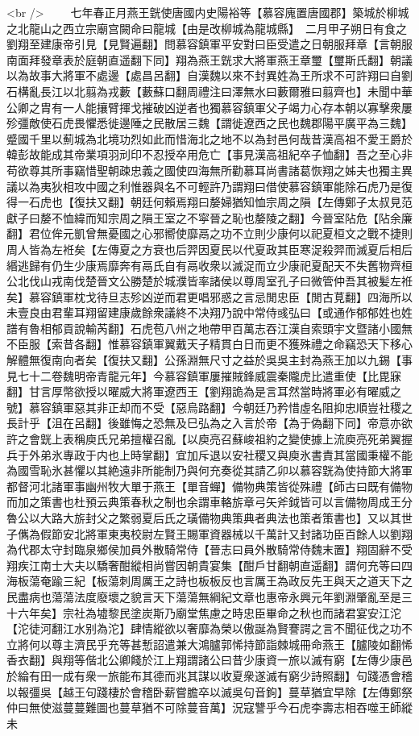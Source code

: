 <br />
　　七年春正月燕王皝使唐國内史陽裕等【慕容廆置唐國郡】築城於柳城之北龍山之西立宗廟宫闕命曰龍城【由是改柳城為龍城縣】　二月甲子朔日有食之　劉翔至建康帝引見【見賢遍翻】問慕容鎮軍平安對曰臣受遣之日朝服拜章【言朝服南面拜發章表於庭朝直遥翻下同】翔為燕王皝求大將軍燕王章璽【璽斯氏翻】朝議以為故事大將軍不處邊【處昌呂翻】自漢魏以來不封異姓為王所求不可許翔曰自劉石構亂長江以北翦為戎藪【藪蘇口翻周禮注曰澤無水曰藪爾雅曰翦齊也】未聞中華公卿之胄有一人能攘臂揮戈摧破凶逆者也獨慕容鎮軍父子竭力心存本朝以寡擊衆屢殄彊敵使石虎畏懼悉徙邊陲之民散居三魏【謂徙遼西之民也魏郡陽平廣平為三魏】蹙國千里以薊城為北境功烈如此而惜海北之地不以為封邑何哉昔漢高祖不愛王爵於韓彭故能成其帝業項羽刓印不忍授卒用危亡【事見漢高祖紀卒子恤翻】吾之至心非苟欲尊其所事竊惜聖朝疎忠義之國使四海無所勸慕耳尚書諸葛恢翔之姊夫也獨主異議以為夷狄相攻中國之利惟器與名不可輕許乃謂翔曰借使慕容鎮軍能除石虎乃是復得一石虎也【復扶又翻】朝廷何賴焉翔曰嫠婦猶知恤宗周之隕【左傳鄭子太叔見范獻子曰嫠不恤緯而知宗周之隕王室之不寜晉之恥也嫠陵之翻】今晉室阽危【阽余廉翻】君位侔元凱曾無憂國之心邪嚮使靡鬲之功不立則少康何以祀夏桓文之戰不捷則周人皆為左袵矣【左傳夏之方衰也后羿因夏民以代夏政其臣寒浞殺羿而滅夏后相后緡逃歸有仍生少康焉靡奔有鬲氏自有鬲收衆以滅浞而立少康祀夏配天不失舊物齊桓公北伐山戎南伐楚晉文公勝楚於城濮皆率諸侯以尊周室孔子曰微管仲吾其被髪左袵矣】慕容鎮軍枕戈待旦志殄凶逆而君更唱邪惑之言忌閒忠臣【閒古莧翻】四海所以未壹良由君輩耳翔留建康歲餘衆議終不决翔乃說中常侍彧弘曰【或通作郁郁姓也姓譜有魯相郁貢說輸芮翻】石虎苞八州之地帶甲百萬志吞江漢自索頭宇文暨諸小國無不臣服【索昔各翻】惟慕容鎮軍翼戴天子精貫白日而更不獲殊禮之命竊恐天下移心解體無復南向者矣【復扶又翻】公孫淵無尺寸之益於吳吳主封為燕王加以九錫【事見七十二卷魏明帝青龍元年】今慕容鎮軍屢摧賊鋒威震秦隴虎比遣重使【比毘寐翻】甘言厚幣欲授以曜威大將軍遼西王【劉翔詭為是言耳然當時將軍必有曜威之號】慕容鎮軍惡其非正却而不受【惡烏路翻】今朝廷乃矜惜虛名阻抑忠順豈社稷之長計乎【沮在呂翻】後雖悔之恐無及巳弘為之入言於帝【為于偽翻下同】帝意亦欲許之會皝上表稱庾氏兄弟擅權召亂【以庾亮召蘇峻祖約之變使據上流庾亮死弟翼握兵于外弟氷專政于内也上時掌翻】宜加斥退以安社稷又與庾氷書責其當國秉權不能為國雪恥氷甚懼以其絶遠非所能制乃與何充奏從其請乙卯以慕容皝為使持節大將軍都督河北諸軍事幽州牧大單于燕王【單音蟬】備物典策皆從殊禮【師古曰既有備物而加之策書也杜預云典策春秋之制也余謂車輅旂章弓矢斧鉞皆可以言備物周成王分魯公以大路大旂封父之繁弱夏后氏之璜備物典策典者典法也策者策書也】又以其世子㒞為假節安北將軍東夷校尉左賢王賜軍資器械以千萬計又封諸功臣百餘人以劉翔為代郡太守封臨泉鄉侯加員外散騎常侍【晉志曰員外散騎常侍魏末置】翔固辭不受翔疾江南士大夫以驕奢酣縱相尚嘗因朝貴宴集【酣戶甘翻朝直遥翻】謂何充等曰四海板蕩奄踰三紀【板蕩刺周厲王之詩也板板反也言厲王為政反先王與天之道天下之民盡病也蕩蕩法度廢壞之貌言天下蕩蕩無綱紀文章也惠帝永興元年劉淵肇亂至是三十六年矣】宗社為墟黎民塗炭斯乃廟堂焦慮之時忠臣畢命之秋也而諸君宴安江沱【沱徒河翻江水别為沱】肆情縱欲以奢靡為榮以傲誕為賢謇諤之言不聞征伐之功不立將何以尊主濟民乎充等甚慙詔遣兼大鴻臚郭悕持節詣棘城冊命燕王【臚陵如翻悕香衣翻】與翔等偕北公卿餞於江上翔謂諸公曰昔少康資一旅以滅有窮【左傳少康邑於綸有田一成有衆一旅能布其德而兆其謀以收夏衆遂滅有窮少詩照翻】句踐憑會稽以報彊吳【越王句踐棲於會稽卧薪嘗膽卒以滅吳句音鉤】蔓草猶宜早除【左傳鄭祭仲曰無使滋蔓蔓難圖也蔓草猶不可除蔓音萬】況寇讐乎今石虎李壽志相吞噬王師縱未